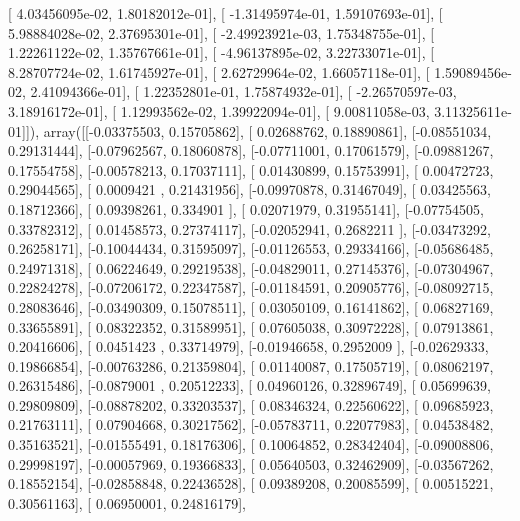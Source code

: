 \documentclass{article}
\begin{document}
       [  4.03456095e-02,   1.80182012e-01],
       [ -1.31495974e-01,   1.59107693e-01],
       [  5.98884028e-02,   2.37695301e-01],
       [ -2.49923921e-03,   1.75348755e-01],
       [  1.22261122e-02,   1.35767661e-01],
       [ -4.96137895e-02,   3.22733071e-01],
       [  8.28707724e-02,   1.61745927e-01],
       [  2.62729964e-02,   1.66057118e-01],
       [  1.59089456e-02,   2.41094366e-01],
       [  1.22352801e-01,   1.75874932e-01],
       [ -2.26570597e-03,   3.18916172e-01],
       [  1.12993562e-02,   1.39922094e-01],
       [  9.00811058e-03,   3.11325611e-01]]), array([[-0.03375503,  0.15705862],
       [ 0.02688762,  0.18890861],
       [-0.08551034,  0.29131444],
       [-0.07962567,  0.18060878],
       [-0.07711001,  0.17061579],
       [-0.09881267,  0.17554758],
       [-0.00578213,  0.17037111],
       [ 0.01430899,  0.15753991],
       [ 0.00472723,  0.29044565],
       [ 0.0009421 ,  0.21431956],
       [-0.09970878,  0.31467049],
       [ 0.03425563,  0.18712366],
       [ 0.09398261,  0.334901  ],
       [ 0.02071979,  0.31955141],
       [-0.07754505,  0.33782312],
       [ 0.01458573,  0.27374117],
       [-0.02052941,  0.2682211 ],
       [-0.03473292,  0.26258171],
       [-0.10044434,  0.31595097],
       [-0.01126553,  0.29334166],
       [-0.05686485,  0.24971318],
       [ 0.06224649,  0.29219538],
       [-0.04829011,  0.27145376],
       [-0.07304967,  0.22824278],
       [-0.07206172,  0.22347587],
       [-0.01184591,  0.20905776],
       [-0.08092715,  0.28083646],
       [-0.03490309,  0.15078511],
       [ 0.03050109,  0.16141862],
       [ 0.06827169,  0.33655891],
       [ 0.08322352,  0.31589951],
       [ 0.07605038,  0.30972228],
       [ 0.07913861,  0.20416606],
       [ 0.0451423 ,  0.33714979],
       [-0.01946658,  0.2952009 ],
       [-0.02629333,  0.19866854],
       [-0.00763286,  0.21359804],
       [ 0.01140087,  0.17505719],
       [ 0.08062197,  0.26315486],
       [-0.0879001 ,  0.20512233],
       [ 0.04960126,  0.32896749],
       [ 0.05699639,  0.29809809],
       [-0.08878202,  0.33203537],
       [ 0.08346324,  0.22560622],
       [ 0.09685923,  0.21763111],
       [ 0.07904668,  0.30217562],
       [-0.05783711,  0.22077983],
       [ 0.04538482,  0.35163521],
       [-0.01555491,  0.18176306],
       [ 0.10064852,  0.28342404],
       [-0.09008806,  0.29998197],
       [-0.00057969,  0.19366833],
       [ 0.05640503,  0.32462909],
       [-0.03567262,  0.18552154],
       [-0.02858848,  0.22436528],
       [ 0.09389208,  0.20085599],
       [ 0.00515221,  0.30561163],
       [ 0.06950001,  0.24816179],
\end{document}
